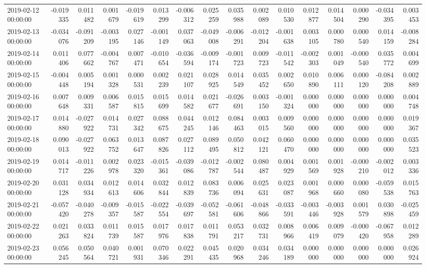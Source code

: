 \begin{tabular}{lrrrrrrrrrrrrrrr}
2019-02-12 00:00:00 & -0.019335 & 0.011482 & 0.001679 & -0.019619 & 0.013299 & -0.006312 & 0.025259 & 0.035988 & 0.002089 & 0.010530 & 0.012877 & 0.014504 & 0.000290 & -0.034395 & 0.003453 \\
2019-02-13 00:00:00 & -0.034076 & -0.091209 & -0.003195 & 0.027146 & -0.001149 & 0.037063 & -0.049008 & -0.006291 & -0.012204 & -0.001638 & 0.003105 & 0.000780 & 0.000540 & 0.014159 & -0.008284 \\
2019-02-14 00:00:00 & 0.011406 & 0.077662 & -0.004767 & 0.007471 & -0.010654 & -0.036594 & -0.009174 & -0.001723 & 0.009723 & -0.011542 & -0.002303 & 0.001049 & -0.000540 & 0.035772 & 0.004699 \\
2019-02-15 00:00:00 & -0.004448 & 0.005194 & 0.001328 & 0.000531 & 0.002239 & 0.021107 & 0.028925 & 0.014549 & 0.035452 & 0.002650 & 0.010890 & 0.006111 & 0.000120 & -0.084208 & 0.002889 \\
2019-02-16 00:00:00 & 0.007648 & 0.009331 & 0.006587 & 0.015815 & 0.015699 & 0.014582 & 0.021677 & -0.026691 & 0.003150 & -0.001324 & 0.000000 & 0.000000 & 0.000000 & 0.000000 & 0.004748 \\
2019-02-17 00:00:00 & 0.014880 & -0.027922 & 0.014731 & 0.027342 & 0.088675 & 0.044245 & 0.012146 & 0.084463 & 0.003015 & 0.009560 & 0.000000 & 0.000000 & 0.000000 & 0.000000 & 0.019367 \\
2019-02-18 00:00:00 & 0.090013 & -0.027922 & 0.063752 & 0.013647 & 0.087826 & 0.027112 & 0.089495 & 0.050812 & 0.042121 & 0.060470 & 0.000000 & 0.000000 & 0.000000 & 0.000000 & 0.035523 \\
2019-02-19 00:00:00 & 0.014717 & -0.011226 & 0.002978 & 0.023320 & -0.015361 & -0.039086 & -0.012787 & -0.002544 & 0.080487 & 0.004929 & 0.001569 & 0.001928 & -0.000210 & -0.002012 & 0.003336 \\
2019-02-20 00:00:00 & 0.031128 & 0.034934 & 0.012613 & 0.014606 & 0.032844 & 0.012839 & 0.083736 & 0.006094 & 0.025631 & 0.023087 & 0.001968 & 0.000660 & 0.000080 & -0.059538 & 0.015763 \\
2019-02-21 00:00:00 & -0.057420 & -0.040278 & -0.009357 & -0.015587 & -0.022554 & -0.039697 & -0.052581 & -0.061606 & -0.048866 & -0.033591 & -0.003446 & -0.003928 & 0.001579 & 0.030898 & -0.025459 \\
2019-02-22 00:00:00 & 0.021263 & 0.033824 & 0.011739 & 0.015587 & 0.017976 & 0.017838 & 0.011791 & 0.053217 & 0.032731 & 0.008966 & 0.006419 & 0.009079 & -0.000420 & -0.067958 & 0.012289 \\
2019-02-23 00:00:00 & 0.056245 & 0.050564 & 0.040721 & 0.001931 & 0.070346 & 0.022291 & 0.045435 & 0.020968 & 0.034246 & 0.034189 & 0.000000 & 0.000000 & 0.000000 & 0.000000 & 0.026924 \\

\end{tabular}
